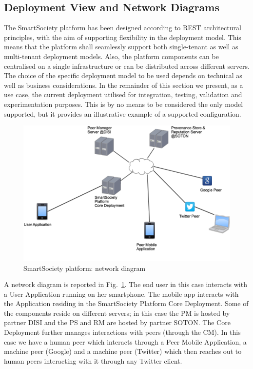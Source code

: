 \subsection{Deployment View and Network Diagrams}
The SmartSociety platform has been designed according to REST architectural principles, with the aim of supporting flexibility in the deployment model. This
means that the platform shall seamlessly support both single-tenant as
well as multi-tenant deployment models. Also, the platform components
can be centralised on a single infrastructure or can be distributed
across different servers. The choice of the specific deployment model
to be used depends on technical as well as business considerations. In
the remainder of this section we present, as a use case, the current
deployment utilised for integration, testing, validation and
experimentation purposes. This is by no means to be considered the
only model supported, but it provides an illustrative example of a
supported configuration. 

\begin{figure}[!hbt]
 \centering
 \includegraphics[width=1\textwidth]{figs/netDiagram}
 \caption{SmartSociety platform: network diagram}
 \label{fig:netDiagram}
\end{figure}

A network diagram is reported in Fig.~\ref{fig:netDiagram}. The end user in this case interacts with a User Application running on her smartphone. The mobile app interacts with the Application residing in the SmartSociety Platform Core Deployment. Some of the components reside on different servers; in this case the PM is hosted by partner DISI and the PS and RM are hosted by partner SOTON. The Core Deployment further manages interactions with peers (through the CM). In this case we have a human peer which interacts through a Peer Mobile Application, a machine peer (Google) and a machine peer (Twitter) which then reaches out to human peers interacting with it through any Twitter client.



